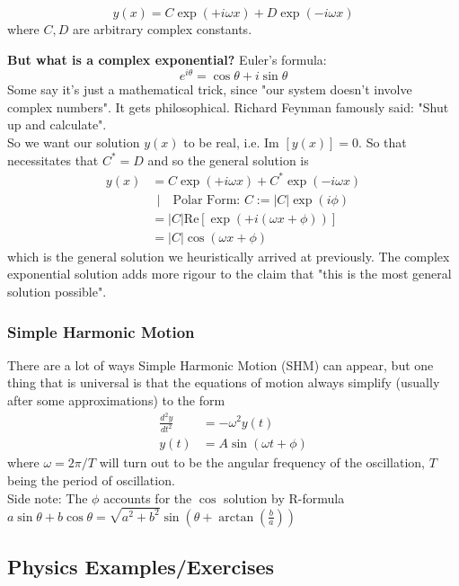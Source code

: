 \documentclass{article}
\begin{document}
$$y(x) = C \exp(+i\omega x) + D \exp(-i \omega x)$$
where $C,D$ are arbitrary complex constants.

\textbf{But what is a complex exponential? } Euler's formula: 
$$e^{i\theta} = \cos \theta + i \sin \theta$$
Some say it's just a mathematical trick, since "our system doesn't involve complex numbers". It gets philosophical. Richard Feynman famously said: "Shut up and calculate". \\[10pt]
So we want our solution $y(x)$ to be real, i.e. $\text{Im }[y(x)] = 0$. So that necessitates that $C^* = D$ and so the general solution is 
\begin{align}
    y(x) &= C \exp(+i\omega x) + C^* \exp(-i\omega x)\\
    &\ \ |\quad \text{Polar Form: }C := |C| \exp(i \phi) \\
    &= |C| \text{Re}[\exp(+i (\omega x + \phi))] \\
    &= |C| \cos (\omega x + \phi)
\end{align}
which is the general solution we heuristically arrived at previously. The complex exponential solution adds more rigour to the claim that "this is the most general solution possible".

\subsubsection{Simple Harmonic Motion}

There are a lot of ways Simple Harmonic Motion (SHM) can appear, but one thing that is universal is that the equations of motion always simplify (usually after some approximations) to the form 
\begin{align}
    \frac{d^2 y}{dt^2} &= -\omega^2 y(t) \\
    y(t) &= A \sin (\omega t + \phi)
\end{align}
where $\omega = 2\pi/T$ will turn out to be the angular frequency of the oscillation, $T$ being the period of oscillation. \\[10pt]
Side note: The $\phi$ accounts for the $\cos$ solution by R-formula $a \sin \theta + b \cos \theta = \sqrt{a^2 + b^2} \sin(\theta + \arctan \left(\frac{b}{a}\right))$



\subsection{Physics Examples/Exercises}
\end{document}
